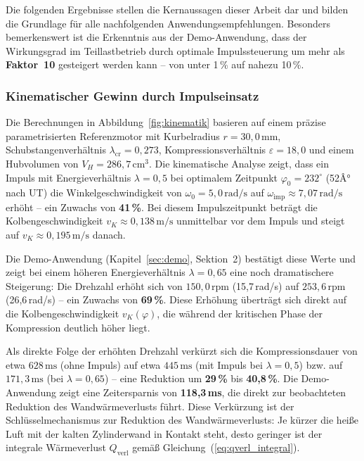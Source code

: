 ﻿\documentclass[a4paper,12pt]{article}
\begin{document}
Die folgenden Ergebnisse stellen die Kernaussagen dieser Arbeit dar und
bilden die Grundlage für alle nachfolgenden Anwendungsempfehlungen. Besonders
bemerkenswert ist die Erkenntnis aus der Demo-Anwendung, dass der Wirkungsgrad
im Teillastbetrieb durch optimale Impulssteuerung um mehr als \textbf{Faktor~10}
gesteigert werden kann -- von unter 1\,\% auf nahezu 10\,\%.

\subsubsection*{Kinematischer Gewinn durch Impulseinsatz}

Die Berechnungen in Abbildung~\ref{fig:kinematik} basieren auf einem
präzise parametrisierten Referenzmotor mit Kurbelradius $r = 30{,}0\,\text{mm}$,
Schubstangenverhältnis $\lambda_\text{cr} = 0{,}273$, Kompressionsverhältnis
$\varepsilon = 18{,}0$ und einem Hubvolumen von $V_H = 286{,}7\,\text{cm}^3$.
Die kinematische Analyse zeigt, dass ein Impuls mit Energieverhältnis
$\lambda = 0{,}5$ bei optimalem Zeitpunkt $\varphi_0 = 232^\circ$ (52Â° nach UT)
die Winkelgeschwindigkeit von $\omega_0 = 5{,}0\,\text{rad/s}$ auf
$\omega_\text{imp} \approx 7{,}07\,\text{rad/s}$ erhöht -- ein Zuwachs von
\textbf{41\,\%}. Bei diesem Impulszeitpunkt beträgt die Kolbengeschwindigkeit
$v_K \approx 0{,}138\,\text{m/s}$ unmittelbar vor dem Impuls und steigt auf
$v_K \approx 0{,}195\,\text{m/s}$ danach.

Die Demo-Anwendung (Kapitel~\ref{sec:demo}, Sektion~2) bestätigt diese
Werte und zeigt bei einem höheren Energieverhältnis $\lambda = 0{,}65$
eine noch dramatischere Steigerung: Die Drehzahl erhöht sich von
$150{,}0\,\text{rpm}$ (15{,}7\,rad/s) auf $253{,}6\,\text{rpm}$
(26{,}6\,rad/s) -- ein Zuwachs von \textbf{69\,\%}. Diese Erhöhung überträgt
sich direkt auf die Kolbengeschwindigkeit $v_K(\varphi)$, die während der
kritischen Phase der Kompression deutlich höher liegt.

Als direkte Folge der erhöhten Drehzahl verkürzt sich die Kompressionsdauer
von etwa $628\,\text{ms}$ (ohne Impuls) auf etwa $445\,\text{ms}$ (mit Impuls
bei $\lambda = 0{,}5$) bzw. auf $171{,}3\,\text{ms}$ (bei $\lambda = 0{,}65$)
-- eine Reduktion um \textbf{29\,\%} bis \textbf{40{,}8\,\%}. Die
Demo-Anwendung zeigt eine Zeitersparnis von \textbf{118{,}3\,ms}, die
direkt zur beobachteten Reduktion des Wandwärmeverlusts führt. Diese
Verkürzung ist der Schlüsselmechanismus zur Reduktion des Wandwärmeverlusts:
Je kürzer die heiße Luft mit der kalten Zylinderwand in Kontakt steht,
desto geringer ist der integrale Wärmeverlust $Q_\text{verl}$ gemäß
Gleichung~(\ref{eq:qverl_integral}).
\end{document}
